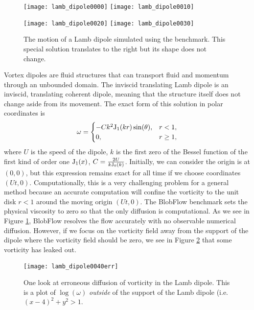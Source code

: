 \documentclass[12pt]{report}
\newcommand{\fig}[1]{Figure \ref{#1}}
\begin{document}
\begin{figure}[t]
\begin{center}
\texttt{[image: lamb\_dipole0000]} \hspace{0.2in}
\texttt{[image: lamb\_dipole0010]}

\texttt{[image: lamb\_dipole0020]} \hspace{0.2in}
\texttt{[image: lamb\_dipole0030]}
\end{center}
\caption{The motion of a Lamb dipole simulated using the
benchmark.  This special solution translates to the
right but its shape does not change.\label{fig:Lamb-dipole}}
\end{figure}
Vortex dipoles are fluid structures that can transport fluid and momentum
through an unbounded domain.
The inviscid translating Lamb dipole is an inviscid, translating coherent
dipole, meaning that the structure itself does not change aside from
its movement. The exact form of this solution in polar coordinates is
\begin{equation}
 \omega = \begin{cases}
-C k^2 {\rm J}_1(k r) \sin(\theta), & r<1, \\
0, & r \geq 1,
\end{cases}
\end{equation}
where $U$ is the speed of the dipole, $k$ is the first zero of the
Bessel function of the first kind of order one 
${\rm J}_1(x)$, $C=\frac{2 U}{k {\rm J}_0(k)}$.  Initially, we can consider
the origin is at $(0,0)$, but this expression remains exact for all time if we
choose coordinates $(U t,0)$.  Computationally, this is a very challenging
problem for a general method because an accurate computation will confine the
vorticity to the unit disk $r<1$ around the moving origin $(Ut,0)$.  The
BlobFlow benchmark sets the physical viscosity to zero so that the only
diffusion is computational.  As we see in \fig{fig:Lamb-dipole}, BlobFlow
resolves the flow accurately with no observable numerical diffusion.  However,
if we focus on the vorticity field away from the support of the dipole where
the vorticity field should be zero, we see in \fig{fig:Lamb-dipole-err} that
some vorticity has leaked out.
\begin{figure}[t]
\begin{center}
\texttt{[image: lamb\_dipole0040err]}
\end{center}
\caption{One look at erroneous diffusion of
vorticity in the Lamb dipole.  This is a plot of
$\log(\omega)$ {\em outside} of the support of the Lamb dipole (i.e. $(x-4)^2 +
y^2 > 1$. \label{fig:Lamb-dipole-err}}
\end{figure}
\end{document}

